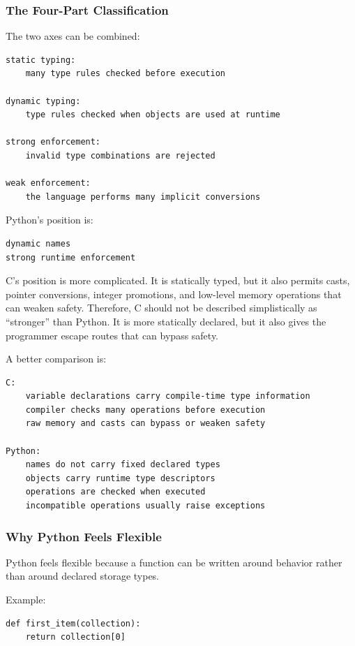\subsubsection*{The Four-Part Classification}

The two axes can be combined:

\begin{verbatim}
static typing:
    many type rules checked before execution

dynamic typing:
    type rules checked when objects are used at runtime

strong enforcement:
    invalid type combinations are rejected

weak enforcement:
    the language performs many implicit conversions
\end{verbatim}

Python's position is:

\begin{verbatim}
dynamic names
strong runtime enforcement
\end{verbatim}

C's position is more complicated. It is statically typed, but it also permits casts, pointer conversions, integer promotions, and low-level memory operations that can weaken safety. Therefore, C should not be described simplistically as ``stronger'' than Python. It is more statically declared, but it also gives the programmer escape routes that can bypass safety.

A better comparison is:

\begin{verbatim}
C:
    variable declarations carry compile-time type information
    compiler checks many operations before execution
    raw memory and casts can bypass or weaken safety

Python:
    names do not carry fixed declared types
    objects carry runtime type descriptors
    operations are checked when executed
    incompatible operations usually raise exceptions
\end{verbatim}

\subsubsection*{Why Python Feels Flexible}

Python feels flexible because a function can be written around behavior rather than around declared storage types.

Example:

\begin{verbatim}
def first_item(collection):
    return collection[0]
\end{verbatim}

